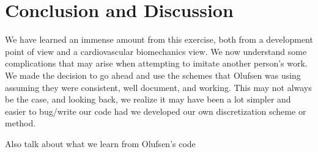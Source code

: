 \documentclass[12pt]{article}
\begin{document}
\section{Conclusion and Discussion}
We have learned an immense amount from this exercise, both from a development point of view and a cardiovascular biomechanics view. We now understand some complications that may arise when attempting to imitate another person's work. We made the decision to go ahead and use the schemes that Olufsen was using assuming they were consistent, well document, and working. This may not always be the case, and looking back, we realize it may have been a lot simpler and easier to bug/write our code had we developed our own discretization scheme or method. 

Also talk about what we learn from Olufsen's code



\end{document}
